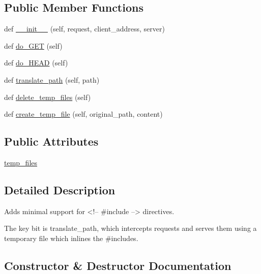 \subsection*{Public Member Functions}
\begin{DoxyCompactItemize}
\item 
def \hyperlink{classssi__server_1_1SSIRequestHandler_af279fca1b9b4a54555fafe2cbf85c145}{\+\_\+\+\_\+init\+\_\+\+\_\+} (self, request, client\+\_\+address, server)
\item 
def \hyperlink{classssi__server_1_1SSIRequestHandler_aa3b488000dbc2ff5cc9bd1c6782032ac}{do\+\_\+\+G\+ET} (self)
\item 
def \hyperlink{classssi__server_1_1SSIRequestHandler_a8a789887b05f6ad59e2f669becad03bd}{do\+\_\+\+H\+E\+AD} (self)
\item 
def \hyperlink{classssi__server_1_1SSIRequestHandler_ae5f46f5007be9c70944c6e98d4b33f65}{translate\+\_\+path} (self, path)
\item 
def \hyperlink{classssi__server_1_1SSIRequestHandler_acd2983c5ead1154be7e6e12a5335bab9}{delete\+\_\+temp\+\_\+files} (self)
\item 
def \hyperlink{classssi__server_1_1SSIRequestHandler_a9cd12eef68d46d5fcddc5fddaec213c9}{create\+\_\+temp\+\_\+file} (self, original\+\_\+path, content)
\end{DoxyCompactItemize}
\subsection*{Public Attributes}
\begin{DoxyCompactItemize}
\item 
\hyperlink{classssi__server_1_1SSIRequestHandler_afb75305b5cb2a913599b40810aeeeb68}{temp\+\_\+files}
\end{DoxyCompactItemize}


\subsection{Detailed Description}
\begin{DoxyVerb}Adds minimal support for <!-- #include --> directives.

The key bit is translate_path, which intercepts requests and serves them
using a temporary file which inlines the #includes.
\end{DoxyVerb}
 

\subsection{Constructor \& Destructor Documentation}
\mbox{\label{classssi__server_1_1SSIRequestHandler_af279fca1b9b4a54555fafe2cbf85c145}} 
